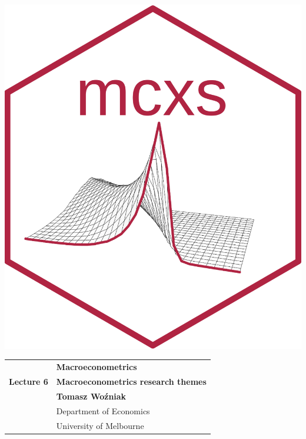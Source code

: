 \documentclass[notes,blackandwhite,mathsans]{beamer}
\begin{document}




\begin{frame}
\centering\includegraphics[scale=1.87]{mcxs.png}
\end{frame}





{
\begin{frame}

\vspace{1cm}
\begin{tabular}{rl}
&\textbf{\LARGE\color{mcxs1} Macroeconometrics}\\[6ex]
\textbf{\color{mcxs3}\Large Lecture 6}&\textbf{\Large\color{mcxs3}Macroeconometrics research themes}\\[19ex]
&\textbf{\color{mcxs1} Tomasz Wo\'zniak}\\[1ex]
&{\small\color{mcxs3} Department of Economics}\\
&{\small\color{mcxs3}University of Melbourne}
\end{tabular}

\end{frame}
}
\end{document}

